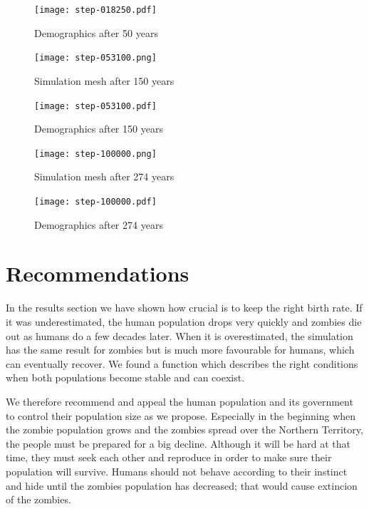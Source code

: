 \documentclass[a4paper]{article}
\begin{document}
\begin{figure}[pht]
    \centering
    \texttt{[image: step-018250.pdf]}
    \caption{Demographics after 50 years}
\end{figure}

\begin{figure}[pht]
    \centering
    \texttt{[image: step-053100.png]}
    \caption{Simulation mesh after 150 years}
\end{figure}

\begin{figure}[pht]
    \centering
    \texttt{[image: step-053100.pdf]}
    \caption{Demographics after 150 years}
\end{figure}

\begin{figure}[pht]
    \centering
    \texttt{[image: step-100000.png]}
    \caption{Simulation mesh after 274 years}
\end{figure}

\begin{figure}[pht]
    \centering
    \texttt{[image: step-100000.pdf]}
    \caption{Demographics after 274 years}
\end{figure}

\section{Recommendations}

In the results section we have shown how crucial is to keep the right birth rate.
If it was underestimated, the human population drops very quickly and zombies die out as humans do a few decades later.
When it is overestimated, the simulation has the same result for zombies but is much more favourable for humans, which can eventually recover.
We found a function which describes the right conditions when both populations become stable and can coexist.

We therefore recommend and appeal the human population and its government to control their population size as we propose.
Especially in the beginning when the zombie population grows and the zombies spread over the Northern Territory, the people must be prepared for a big decline.
Although it will be hard at that time, they must seek each other and reproduce in order to make sure their population will survive.
Humans should not behave according to their instinct and hide until the zombies population has decreased; that would cause extincion of the zombies.





\begingroup
\raggedright



\endgroup
\end{document}
